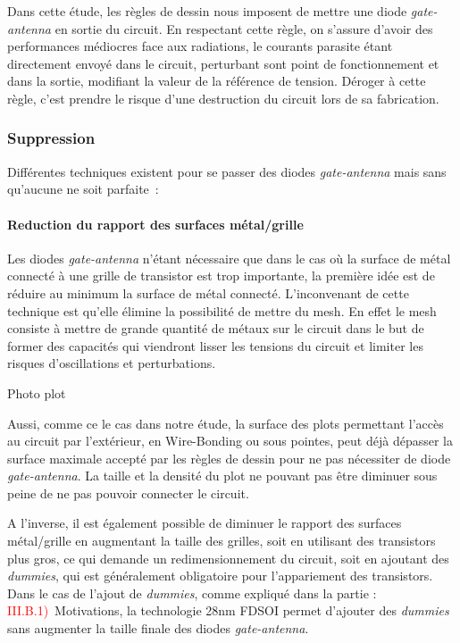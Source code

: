 Dans cette étude, les règles de dessin nous imposent de mettre une diode \textit{gate-antenna} en sortie du circuit. En respectant cette règle, on s’assure d’avoir des performances médiocres face aux radiations, le courants parasite étant directement envoyé dans le circuit, perturbant sont point de fonctionnement et dans la sortie, modifiant la valeur de la référence de tension. Déroger à cette règle, c’est prendre le risque d’une destruction du circuit lors de sa fabrication.

\subsubsection{Suppression}
Différentes techniques existent pour se passer des diodes \textit{gate-antenna} mais sans qu’aucune ne soit parfaite :
\paragraph{Reduction du rapport des surfaces métal/grille}
Les diodes \textit{gate-antenna} n’étant nécessaire que dans le cas où la surface de métal connecté à une grille de transistor est trop importante, la première idée est de réduire au minimum la surface de métal connecté. L’inconvenant de cette technique est qu’elle élimine la possibilité de mettre du mesh. En effet le mesh consiste à mettre de grande quantité de métaux sur le circuit dans le but de former des capacités qui viendront lisser les tensions du circuit et limiter les risques d’oscillations et perturbations.

\begin{metsUneSource}
Photo plot
\end{metsUneSource}

Aussi, comme ce le cas dans notre étude, la surface des plots permettant l’accès au circuit par l’extérieur, en Wire-Bonding ou sous pointes, peut déjà dépasser la surface maximale accepté par les règles de dessin pour ne pas nécessiter de diode \textit{gate-antenna}. La taille et la densité du plot ne pouvant pas être diminuer sous peine de ne pas pouvoir connecter le circuit.

A l'inverse, il est également possible de diminuer le rapport des surfaces métal/grille en augmentant la taille des grilles, soit en utilisant des transistors plus gros, ce qui demande un redimensionnement du circuit, soit en ajoutant des \textit{dummies}, qui est généralement obligatoire pour l'appariement des transistors.
Dans le cas de l'ajout de \textit{dummies}, comme expliqué dans la partie : \textcolor{red}{III.B.1)} Motivations, la technologie 28nm FDSOI permet d'ajouter des \textit{dummies} sans augmenter la taille finale des diodes \textit{gate-antenna}.

